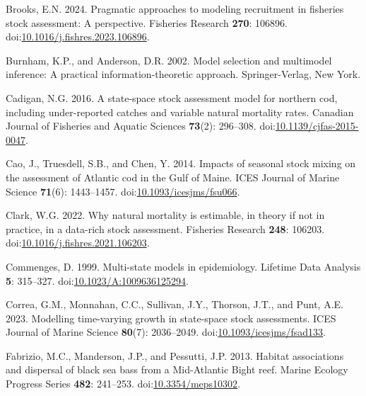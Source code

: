 \documentclass[
]{article}
\newlength{\cslhangindent}
\newlength{\cslentryspacingunit} %
\newenvironment{CSLReferences}[2] %
 {%
  \setlength{\parindent}{0pt}
  \ifodd #1
  \let\oldpar\par
  \def\par{\hangindent=\cslhangindent\oldpar}
  \fi
  \setlength{\parskip}{#2\cslentryspacingunit}
 }%
 {}
\begin{document}
\begin{CSLReferences}{1}{0}
\leavevmode{}%
Brooks, E.N. 2024. Pragmatic approaches to modeling recruitment in fisheries stock assessment: A perspective. Fisheries Research \textbf{270}: 106896. doi:\href{https://doi.org/10.1016/j.fishres.2023.106896}{10.1016/j.fishres.2023.106896}.

\leavevmode{}%
Burnham, K.P., and Anderson, D.R. 2002. Model selection and multimodel inference: A practical information-theoretic approach. Springer-Verlag, New York.

\leavevmode{}%
Cadigan, N.G. 2016. A state-space stock assessment model for northern cod, including under-reported catches and variable natural mortality rates. Canadian Journal of Fisheries and Aquatic Sciences \textbf{73}(2): 296--308. doi:\href{https://doi.org/10.1139/cjfas-2015-0047}{10.1139/cjfas-2015-0047}.

\leavevmode{}%
Cao, J., Truesdell, S.B., and Chen, Y. 2014. Impacts of seasonal stock mixing on the assessment of {A}tlantic cod in the {G}ulf of {M}aine. ICES Journal of Marine Science \textbf{71}(6): 1443--1457. doi:\href{https://doi.org/10.1093/icesjms/fsu066}{10.1093/icesjms/fsu066}.

\leavevmode{}%
Clark, W.G. 2022. Why natural mortality is estimable, in theory if not in practice, in a data-rich stock assessment. Fisheries Research \textbf{248}: 106203. doi:\href{https://doi.org/10.1016/j.fishres.2021.106203}{10.1016/j.fishres.2021.106203}.

\leavevmode{}%
Commenges, D. 1999. Multi-state models in epidemiology. Lifetime Data Analysis \textbf{5}: 315--327. doi:\href{https://doi.org/10.1023/A:1009636125294}{10.1023/A:1009636125294}.

\leavevmode{}%
Correa, G.M., Monnahan, C.C., Sullivan, J.Y., Thorson, J.T., and Punt, A.E. 2023. Modelling time-varying growth in state-space stock assessments. ICES Journal of Marine Science \textbf{80}(7): 2036--2049. doi:\href{https://doi.org/10.1093/icesjms/fsad133}{10.1093/icesjms/fsad133}.

\leavevmode{}%
Fabrizio, M.C., Manderson, J.P., and Pessutti, J.P. 2013. Habitat associations and dispersal of black sea bass from a {M}id-{A}tlantic {B}ight reef. Marine Ecology Progress Series \textbf{482}: 241--253. doi:\href{https://doi.org/10.3354/meps10302}{10.3354/meps10302}.


\end{CSLReferences}
\end{document}
